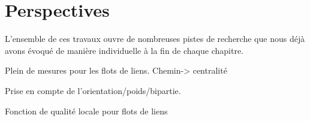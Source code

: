 \bigskip




\section{Perspectives}

L'ensemble de ces travaux ouvre de nombreuses pistes de recherche que nous déjà avons évoqué de manière individuelle à la fin de chaque chapitre.

Plein de mesures pour les flots de liens.
Chemin-> centralité

Prise en compte de l'orientation/poids/bipartie.


Fonction de qualité locale pour flots de liens

